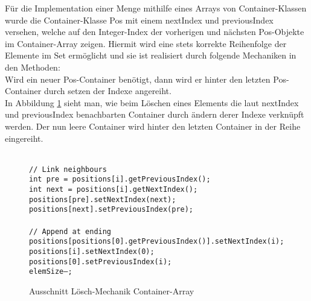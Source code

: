 \documentclass[11pt]{scrartcl}
\begin{document}
Für die Implementation einer Menge mithilfe eines Arrays von Container-Klassen wurde die Container-Klasse Pos mit einem nextIndex und previousIndex versehen, 
welche auf den Integer-Index der vorherigen und nächsten Pos-Objekte im Container-Array zeigen. 
Hiermit wird eine stets korrekte Reihenfolge der Elemente im Set ermöglicht und sie ist realisiert durch folgende Mechaniken in den Methoden:\\
Wird ein neuer Pos-Container benötigt, dann wird er hinter den letzten Pos-Container durch setzen der Indexe angereiht.\\
In Abbildung \ref{figure:delmech} sieht man, wie beim Löschen eines Elements die laut nextIndex und previousIndex benachbarten Container durch ändern derer Indexe verknüpft werden. Der nun leere Container wird hinter den letzten Container in der Reihe eingereiht.
\begin{figure}[h!]
\texttt{ \\
// Link neighbours\\
int pre = positions[i].getPreviousIndex();\\
int next = positions[i].getNextIndex();\\
positions[pre].setNextIndex(next);\\
positions[next].setPreviousIndex(pre);\\
\\
// Append at ending\\
positions[positions[0].getPreviousIndex()].setNextIndex(i);\\
positions[i].setNextIndex(0);\\
positions[0].setPreviousIndex(i);\\
elemSize--;\\
}
\caption{Ausschnitt Lösch-Mechanik Container-Array}
\label{figure:delmech}
\end{figure}
\end{document}
